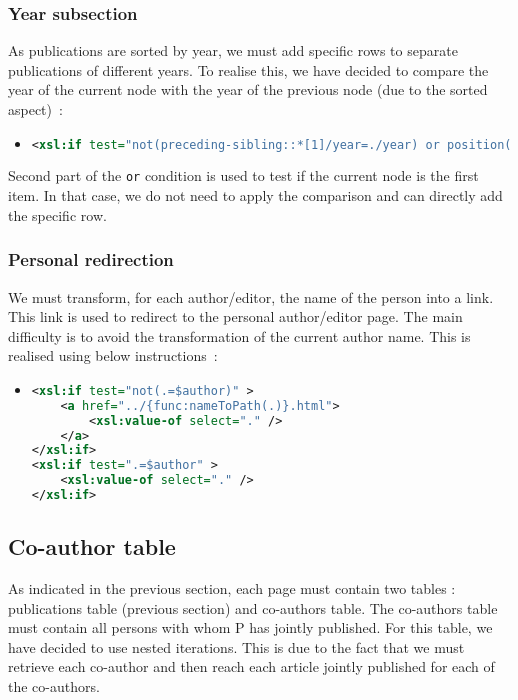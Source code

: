 \documentclass{article}
\begin{document}
    \subsubsection{Year subsection}
      As publications are sorted by year, we must add specific rows to separate publications of different years. To realise this, we have decided to compare the year of the current node with the year of the previous node (due to the sorted aspect)~:
      \begin{itemize}
	\item \begin{lstlisting}[language=XML]
<xsl:if test="not(preceding-sibling::*[1]/year=./year) or position()=1">\end{lstlisting}
      \end{itemize}
      Second part of the \verb|or| condition is used to test if the current node is the first item. In that case, we do not need to apply the comparison and can directly add the specific row.
      
    \subsubsection{Personal redirection}
    We must transform, for each author/editor, the name of the person into a link. This link is used to redirect to the personal author/editor page. The main difficulty is to avoid the transformation of the current author name. This is realised using below instructions~:
      \begin{itemize}
	\item \begin{lstlisting}[language=XML]
<xsl:if test="not(.=$author)" >
    <a href="../{func:nameToPath(.)}.html">
        <xsl:value-of select="." />
    </a>
</xsl:if>
<xsl:if test=".=$author" >
    <xsl:value-of select="." />
</xsl:if>\end{lstlisting}
      \end{itemize}

  \subsection{Co-author table}
  As indicated in the previous section, each page must contain two tables : publications table (previous section) and co-authors table. The co-authors table must contain all persons with whom P has jointly published. For this table, we have decided to use nested iterations. This is due to the fact that we must retrieve each co-author and then reach each article jointly published for each of the co-authors.
  
\end{document}
